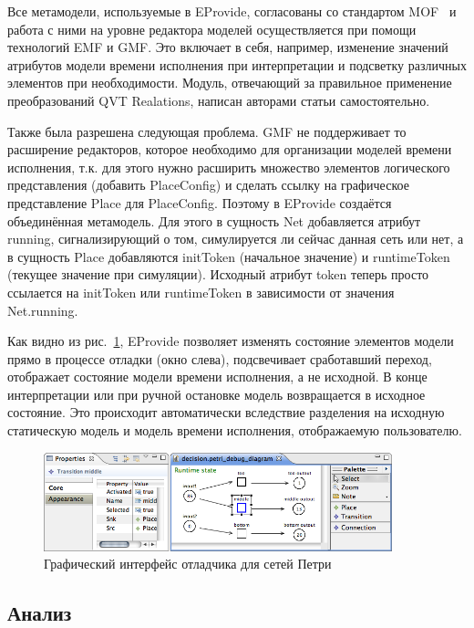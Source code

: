 \documentclass[a5paper]{article}
\begin{document}
Все метамодели, используемые в EProvide, согласованы со стандартом MOF~\cite{mof} и работа с ними на уровне редактора моделей осуществляется при помощи технологий EMF и GMF. Это включает в себя, например, изменение значений атрибутов модели времени исполнения при интерпретации и подсветку различных элементов при необходимости. Модуль, отвечающий за правильное применение преобразований QVT Realations, написан авторами статьи самостоятельно. 

Также была разрешена следующая проблема. GMF не поддерживает то расширение редакторов, которое необходимо для организации моделей времени исполнения, т.к. для этого нужно расширить множество элементов логического представления (добавить PlaceConfig) и сделать ссылку на графическое представление Place для PlaceConfig. Поэтому в EProvide создаётся объединённая метамодель. Для этого в сущность Net добавляется атрибут running, сигнализирующий о том, симулируется ли сейчас данная сеть или нет, а в сущность Place добавляются initToken (начальное значение) и runtimeToken (текущее значение при симуляции). Исходный атрибут token теперь просто ссылается на initToken или runtimeToken в зависимости от значения Net.running.

Как видно из рис.~\ref{fig11}, EProvide позволяет изменять состояние элементов модели прямо в процессе отладки (окно слева), подсвечивает сработавший переход, отображает состояние модели времени исполнения, а не исходной. В конце интерпретации или при ручной остановке модель возвращается в исходное состояние. Это происходит автоматически вследствие разделения на исходную статическую модель и модель времени исполнения, отображаемую пользователю.

\begin{figure} [ht]
  \begin{center}
    \includegraphics[width=0.9\textwidth]{eprovide-screen.png}
    \caption{Графический интерфейс отладчика для сетей Петри}
    \label{fig11}
  \end{center}
\end{figure}

\subsection{Анализ}
\end{document}
